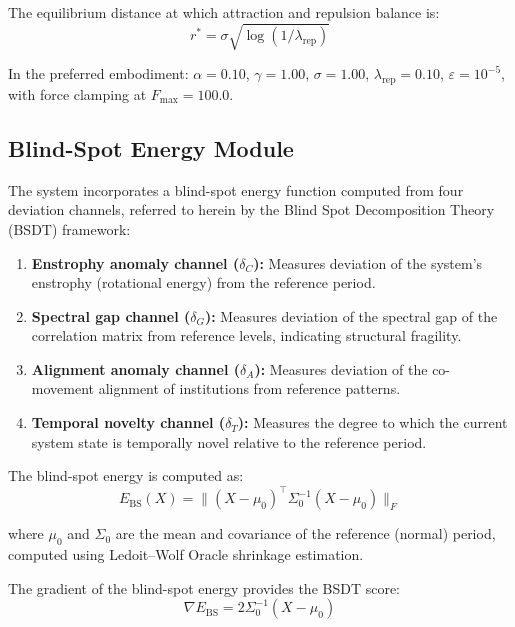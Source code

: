 \documentclass[12pt,a4paper]{article}
\begin{document}
The equilibrium distance at which attraction and repulsion balance is:
\begin{equation}
r^* = \sigma\sqrt{\log(1/\lambda_{\text{rep}})}
\end{equation}

In the preferred embodiment: $\alpha = 0.10$, $\gamma = 1.00$, $\sigma = 
1.00$, $\lambda_{\text{rep}} = 0.10$, $\varepsilon = 10^{-5}$, with force 
clamping at $F_{\max} = 100.0$.

\subsection{Blind-Spot Energy Module}

The system incorporates a blind-spot energy function computed from four 
deviation channels, referred to herein by the Blind Spot Decomposition 
Theory (BSDT) framework:

\begin{enumerate}[label=(\alph*)]
\item \textbf{Enstrophy anomaly channel ($\delta_C$):} Measures deviation 
of the system's enstrophy (rotational energy) from the reference period.

\item \textbf{Spectral gap channel ($\delta_G$):} Measures deviation of 
the spectral gap of the correlation matrix from reference levels, indicating 
structural fragility.

\item \textbf{Alignment anomaly channel ($\delta_A$):} Measures deviation 
of the co-movement alignment of institutions from reference patterns.

\item \textbf{Temporal novelty channel ($\delta_T$):} Measures the degree 
to which the current system state is temporally novel relative to the 
reference period.
\end{enumerate}

The blind-spot energy is computed as:
\begin{equation}
E_{\text{BS}}(X) = \|(X - \mu_0)^\top \Sigma_0^{-1} (X - \mu_0)\|_F
\end{equation}

where $\mu_0$ and $\Sigma_0$ are the mean and covariance of the reference 
(normal) period, computed using Ledoit--Wolf Oracle shrinkage estimation.

The gradient of the blind-spot energy provides the BSDT score:
\begin{equation}
\nabla E_{\text{BS}} = 2\Sigma_0^{-1}(X - \mu_0)
\end{equation}
\end{document}
